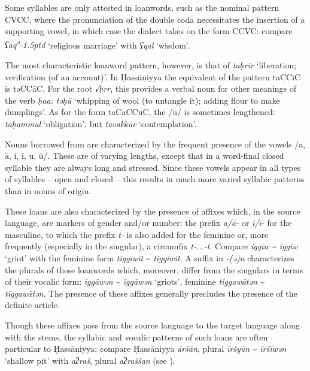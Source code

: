 \documentclass[output=paper]{langsci/langscibook}
\begin{document}
Some syllables are only attested in {loanwords}, such as the nominal pattern CVCC, where the pronunciation of the double {coda} necessitates the insertion of a supporting vowel, in which case the dialect takes on the form CCVC: compare \textit{ʕaq\kern 0.5pt\textsuperscript{ə}\kern -1.5ptd} ‘religious marriage’ with \textit{ʕqal} ‘wisdom’.

The most characteristic {loanword} pattern, however, is that of \textit{taḥrīr} ‘liberation; verification (of an account)’. In Ḥassāniyya the equivalent of the pattern taCCīC is təCCāC. For the {root} \textit{√ḥrr}, this provides a verbal noun for other meanings of the verb \textit{ḥa{\R}{\R}a{\R}:} \textit{təḥ{\R}ā{\R}} ‘whipping of wool (to untangle it); adding flour to make dumplings’. As for the form taCaCCuC, the /u/ is sometimes lengthened: \textit{taḥammul} ‘obligation’, but \textit{tavakkūr} ‘contemplation’.

\largerpage
Nouns borrowed from  are characterized by the frequent presence of the vowels /a, ā, i, ī, u, ū/. These are of varying lengths, except that in a word-final closed syllable they are always long and stressed. Since these vowels appear in all types of syllables – open and closed – this results in much more varied syllabic patterns than in nouns of  origin. 

These loans are also characterized by the presence of affixes which, in the {source language}, are markers of {gender} and/or number: the prefix \textit{a/ā-} or \textit{i/ī-} for the masculine, to which the prefix \textit{t-} is also added for the feminine or, more frequently (especially in the singular), a circumfix \textit{t-...-t}. Compare \textit{iggīw} \~{} \textit{īggīw} ‘griot’ with the feminine form \textit{tiggiwīt} \~{} \textit{tīggīwīt}. A suffix in \textit{-(ə)n} characterizes the plurals of these {loanwords} which, moreover, differ from the singulars in terms of their vocalic form: \textit{iggāwən} \~{} \textit{īggāwən} ‘griots’, feminine \textit{tiggawātən} \~{} \textit{tīggawātən}. The presence of these affixes generally precludes the presence of the {definite} {article}.

Though these affixes pass from the {source language} to the target language along with the stems, the syllabic and vocalic patterns of such loans are often particular to Ḥassāniyya: compare Ḥassāniyya \textit{āršān}, plural \textit{īršyūn} \~{} \textit{īršīwən} ‘shallow pit’ with  \textit{aʔraš}, plural \textit{aʔraššan} (see \citealt{Taine-Cheikh1997Zenaga}).
\end{document}
